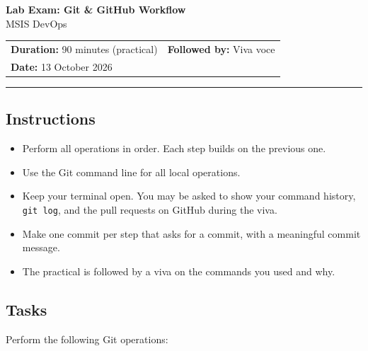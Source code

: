 \documentclass[11pt,a4paper]{article}
\newcommand{\cmd}[1]{\texttt{#1}}
\begin{document}
\begin{center}
  {\LARGE\bfseries Lab Exam: Git \& GitHub Workflow}\\[6pt]
  {\large MSIS DevOps}
\end{center}

\vspace{4pt}

\noindent
\begin{tabular}{@{}p{}p{}@{}}
  \textbf{Duration:} 90 minutes (practical) & \textbf{Followed by:} Viva voce \\[4pt]
  \textbf{Date:} 13 October 2026 & \\
\end{tabular}

\vspace{8pt}
\hrule
\vspace{8pt}

\subsection*{Instructions}
\begin{itemize}[leftmargin=*,itemsep=2pt]
  \item Perform all operations in order. Each step builds on the previous one.
  \item Use the Git command line for all local operations.
  \item Keep your terminal open. You may be asked to show your command history,
        \cmd{git log}, and the pull requests on GitHub during the viva.
  \item Make one commit per step that asks for a commit, with a meaningful commit message.
  \item The practical is followed by a viva on the commands you used and why.
\end{itemize}

\subsection*{Tasks}
Perform the following Git operations:
\end{document}
